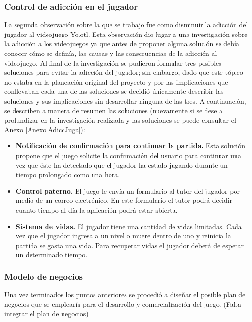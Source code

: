 \subsubsection{Control de adicción en el jugador}
La segunda observación sobre la que se trabajo fue como disminuir la adicción 
del jugador al videojuego Yolotl. Esta observación dio lugar a una investigación 
sobre la adicción a los videojuegos ya que antes de proponer alguna solución se 
debía conocer cómo se definía, las causas y las consecuencias de la adicción al 
videojuego. Al final de la investigación se pudieron formular tres posibles 
soluciones para evitar la adicción del jugador; sin embargo, dado que este tópico 
no estaba en la planeación original del proyecto y por las implicaciones que 
conllevaban cada una de las soluciones se decidió únicamente describir las 
soluciones y sus implicaciones sin desarrollar ninguna de las tres. A continuación, 
se describen a manera de resumen las soluciones (nuevamente si se dese a 
profundizar en la investigación realizada y las soluciones se puede consultar 
el Anexo \ref{Anexo:AdiccJuga}):
	\begin{itemize}
		\item \textbf{Notificación de confirmación para continuar la partida.} Esta 
		solución propone que el juego solicite la confirmación del usuario para 
		continuar una vez que éste ha detectado que el jugador ha estado jugando 
		durante un tiempo prolongado como una hora.
		\item \textbf{Control paterno.} El juego le envía un formulario al tutor del 
		jugador por medio de un correo electrónico. En este formulario el tutor podrá 
		decidir cuanto tiempo al día la aplicación podrá estar abierta. 
		\item \textbf{Sistema de vidas.} El jugador tiene una cantidad de vidas 
		limitadas. Cada vez que el jugador ingresa a un nivel o muere dentro de 
		uno y reinicia la partida se gasta una vida. Para recuperar vidas el 
		jugador deberá de esperar un determinado tiempo.
	\end{itemize}
\subsubsection{Modelo de negocios}
Una vez terminados los puntos anteriores se procedió a diseñar el posible plan 
de negocios que se emplearía para el desarrollo y comercialización del juego. 
(Falta integrar el plan de negocios)
	